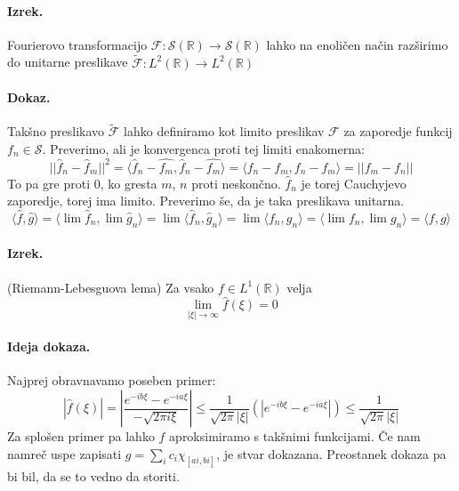 \documentclass[a4paper]{article}
\newcommand{\R}{\mathbb{R}}
\newcommand{\fn}[3]{{#1}\colon {#2} \rightarrow {#3}}
\newcommand{\avg}[1]{\langle {#1} \rangle}
\begin{document}
\paragraph{Izrek.} Fourierovo transformacijo $\fn{\mathcal{F}}{\mathcal{S}(\R)}{\mathcal{S}(\R)}$ lahko na enoličen način razširimo do unitarne preslikave
$\fn{\tilde{\mathcal{F}}}{L^2(\R)}{L^2(\R)}$
\paragraph{Dokaz.} Takšno preslikavo $\tilde{\mathcal{F}}$ lahko definiramo kot limito preslikav $\mathcal{F}$ za zaporedje funkcij $f_n \in \mathcal{S}$. Preverimo, ali je 
konvergenca proti tej limiti enakomerna:
$$||\hat{f}_n - \hat{f}_m||^2 = \avg{\hat{f}_n - \hat{f_m}, \hat{f}_n - \hat{f_m}} = \avg{f_n - f_m, f_n - f_m} = ||f_m - f_n||$$
To pa gre proti 0, ko gresta $m$, $n$ proti neskončno. $\hat{f}_n$ je torej Cauchyjevo zaporedje, torej ima limito. Preverimo še, da je taka preslikava unitarna.
$$\avg{\hat{f}, \hat{g}} = \avg{\lim \hat{f}_n, \lim \hat{g}_n} = \lim \avg{\hat{f}_n, \hat{g}_n} = \lim\avg{f_n, g_n} = \avg{\lim f_n, \lim g_n} = \avg{f, g}$$
\paragraph{Izrek.} (Riemann-Lebesguova lema) Za vsako $f \in L^1(\R)$ velja $$\lim_{|\xi| \to \infty}\hat{f}(\xi) = 0$$
\paragraph{Ideja dokaza.} Najprej obravnavamo poseben primer: $$\left|\hat{f}(\xi)\right| = \left|\frac{e^{-ib\xi} - e^{-ia\xi}}{-\sqrt{2\pi i \xi}}\right| \leq \frac{1}{\sqrt{2\pi}|\xi|} \left(\left|e^{-ib\xi} - e^{-ia\xi}\right|\right) \leq \frac{1}{\sqrt{2\pi}|\xi|}$$
Za splošen primer pa lahko $f$ aproksimiramo s takšnimi funkcijami. Če nam namreč uspe zapisati $\displaystyle{g = \sum_i c_i \chi_{[ai, bi]}}$, je stvar dokazana. Preostanek dokaza pa bi bil, da se to vedno da storiti.
\end{document}
